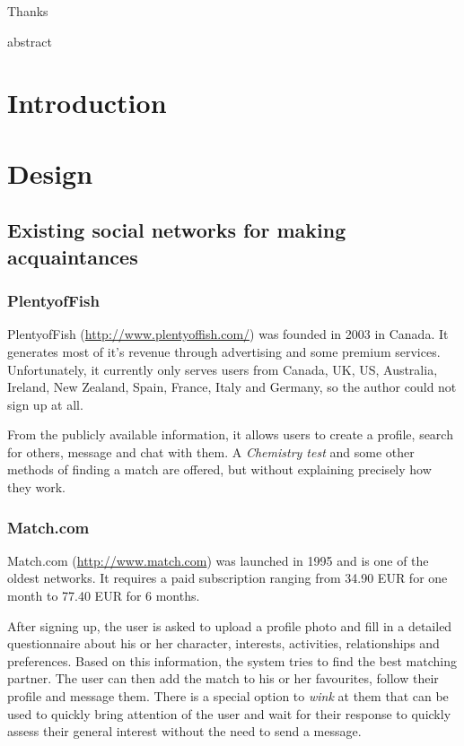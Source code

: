 \documentclass[12pt,oneside]{fithesis}
\begin{document}
\FrontMatter
\ThesisTitlePage

\begin{ThesisDeclaration}
\DeclarationText
\AdvisorName
\end{ThesisDeclaration}

\begin{ThesisThanks}
Thanks
\end{ThesisThanks}

abstract

\MainMatter
\tableofcontents
\chapter*{Introduction}
\chapter{Design}
\section{Existing social networks for making acquaintances}
	\subsection{PlentyofFish}
		PlentyofFish (\url{http://www.plentyoffish.com/}) was founded in 2003 in Canada. It generates most of it's revenue through advertising and some premium services. Unfortunately, it currently only serves users from Canada, UK, US, Australia, Ireland, New Zealand, Spain, France, Italy and Germany, so the author could not sign up at all.
		
		From the publicly available information, it allows users to create a profile, search for others, message and chat with them. A \emph{Chemistry test} and some other methods of finding a match are offered, but without explaining precisely how they work. \cite{website:pof}
		\subsection{Match.com}
		Match.com (\url{http://www.match.com}) was launched in 1995 and is one of the oldest networks. It requires a paid subscription ranging from 34.90 EUR for one month  to 77.40 EUR for 6 months.
		
		After signing up, the user is asked to upload a profile photo and fill in a detailed questionnaire about his or her character, interests, activities, relationships and preferences. Based on this information, the system tries to find the best matching partner. The user can then add the match to his or her favourites, follow their profile and message them. There is a special option to \emph{wink} at them that can be used to quickly bring attention of the user and wait for their response to quickly assess their general interest without the need to send a message. \cite{website:match}
		
\end{document}
